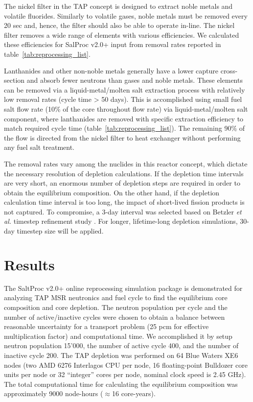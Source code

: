 \documentclass[12pt]{article} %
\begin{document}
The nickel filter in the \gls{TAP} concept is designed to extract noble metals 
and volatile fluorides. Similarly to volatile gases, noble metals must be 
removed every 20 sec and, hence, the filter should also be able to operate 
in-line. The nickel filter removes a wide range of elements with various 
efficiencies. We calculated these efficiencies for SalProc v2.0+ input 
from removal rates reported in table~\ref{tab:reprocessing_list}.

Lanthanides and other non-noble metals generally have a lower capture 
cross-section and absorb fewer neutrons than gases and noble metals. These 
elements can be removed via a liquid-metal/molten salt extraction process with 
relatively low removal rates (cycle time > 50 days). This is accomplished 
using small fuel salt flow rate (10\% of the core throughout flow rate) via 
liquid-metal/molten salt component, where lanthanides are removed with 
specific extraction efficiency to match required cycle time  
(table~\ref{tab:reprocessing_list}). The remaining 90\% of the flow is 
directed  from the nickel filter to heat exchanger without performing any fuel 
salt treatment.

The removal rates vary among the nuclides in this reactor concept, which 
dictate the necessary resolution of depletion calculations. If the depletion 
time intervals are very short, an enormous number of depletion steps are 
required in order to obtain the equilibrium composition. On the other hand, if 
the depletion calculation time interval is too long, the impact of short-lived 
fission products is not captured. To compromise, a 3-day interval was selected 
based on Betzler \emph{et al.} timestep refinement study  
\cite{betzler_assessment_2017}. For longer, lifetime-long depletion  
simulations, 30-day timestep size will be applied.

\section{Results}
The SaltProc v2.0+ online reprocessing simulation package is demonstrated for 
analyzing \gls{TAP} \gls{MSR} neutronics and fuel cycle to find the equilibrium core composition and core depletion. The neutron population per cycle and the number 
of active/inactive cycles were chosen to obtain a balance between reasonable 
uncertainty for a transport problem (25 pcm for effective multiplication factor) 
and computational time. We accomplished it by setup neutron population 15'000, 
the number of active cycle 400, and the number of inactive cycle 200. 
The \gls{TAP} depletion was performed on 64 Blue Waters 
XE6 nodes (two AMD 6276 Interlagos CPU per node, 16 floating-point Bulldozer 
core units per node or 32 ``integer'' cores per node, nominal clock speed is 
2.45 GHz). The total computational time for calculating the equilibrium 
composition was approximately 9000 node-hours ($\approx$16 core-years).
\end{document}
